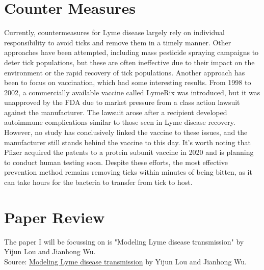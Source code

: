 \documentclass{report}
\begin{document}
\section{Counter Measures}
Currently, countermeasures for Lyme disease largely rely on individual responsibility to avoid ticks and remove them in a timely manner. Other approaches have been attempted, including mass pesticide spraying campaigns to deter tick populations, but these are often ineffective due to their impact on the environment or the rapid recovery of tick populations. Another approach has been to focus on vaccination, which had some interesting results. From 1998 to 2002, a commercially available vaccine called LymeRix was introduced, but it was unapproved by the FDA due to market pressure from a class action lawsuit against the manufacturer. The lawsuit arose after a recipient developed autoimmune complications similar to those seen in Lyme disease recovery. However, no study has conclusively linked the vaccine to these issues, and the manufacturer still stands behind the vaccine to this day. It's worth noting that Pfizer acquired the patents to a protein subunit vaccine in 2020 and is planning to conduct human testing soon. Despite these efforts, the most effective prevention method remains removing ticks within minutes of being bitten, as it can take hours for the bacteria to transfer from tick to host.
\section{Paper Review}
The paper I will be focussing on is "Modeling Lyme disease transmission" by Yijun Lou and Jianhong Wu.\\
Source: \href{https://www.sciencedirect.com/science/article/pii/S0022519312003904}{Modeling Lyme disease transmission} by Yijun Lou and Jianhong Wu.
\end{document}
